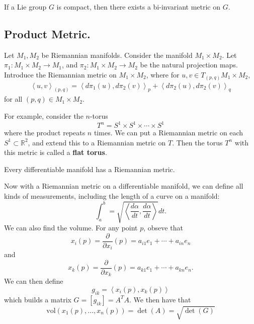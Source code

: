 \documentclass[12pt,letterpaper,boxed]{maths_v5}
\newcommand{\rr}{\mathbb{R}}
\theoremstyle{definition}
\begin{document}
\begin{thm}
    If a Lie group $G$ is compact, then there exists a bi-invariant 
    metric on $G$. 
\end{thm}

\subsection*{Product Metric.}

Let $M_1, M_2$ be Riemannian manifolds. Consider the manifold $M_1\times M_2$. 
Let $\pi_1: M_1\times M_2 \to M_1$, and $\pi_2: M_1 \times M_2 \to M_2$ be the 
natural projection maps. Introduce the Riemannian metric on $M_1\times M_2$, 
where for $u, v \in T_{(p,q)}M_1 \times M_2$, 
\begin{align*}
    \left<u , v  \right>_{(p, q)}  = \left<d\pi_1(u), d\pi_2(v)  \right>_p
    + \left<d\pi_2(u), d\pi_2(v)\right>_q
\end{align*}
for all $(p, q)\in M_1\times M_2$. 

For example, consider the $n$-torus 
\[
    T^n = S^1\times S^1 \times \cdots\times S^1
\]
where the product repeats $n$ times.
We can put a Riemannian metric on each $S^1 \subset \rr^2$, and  
extend this to a Riemannian metric on $T$. 
Then the torus $T^n$ with this metric is called a \textbf{flat torus}.

\begin{thm}
    Every differentiable manifold has a Riemannian metric. 
\end{thm}

Now with a Riemannian metric on a differentiable manifold, 
we can define all kinds of measurements, including the length  
of a curve on a manifold: 
\[
    \int_a^{b} = \sqrt{\left<\frac{d\alpha}{dt} , \frac{d\alpha}{dt} \right>}dt.
\] 
We can also find the volume. For any point $p$, obseve that 
\[
    x_i(p) = \frac{\partial}{\partial x_i}(p) = a_{i1}e_1 + \cdots + a_{in}e_n
\]
and 
\[
    x_k(p) = \frac{\partial}{\partial x_k}(p) = a_{k1}e_1 + \cdots + a_{kn}e_n.
\]
We can then define 
\[
    g_{ik} = \left< x_i(p), x_k(p) \right> 
\]
which builds a matrix $G = [g_{ik}] = A^TA$. We then have that  
\[
    \text{vol}(x_1(p), \dots, x_n(p)) = \det(A) = \sqrt{\det(G)}
\]
\end{document}
